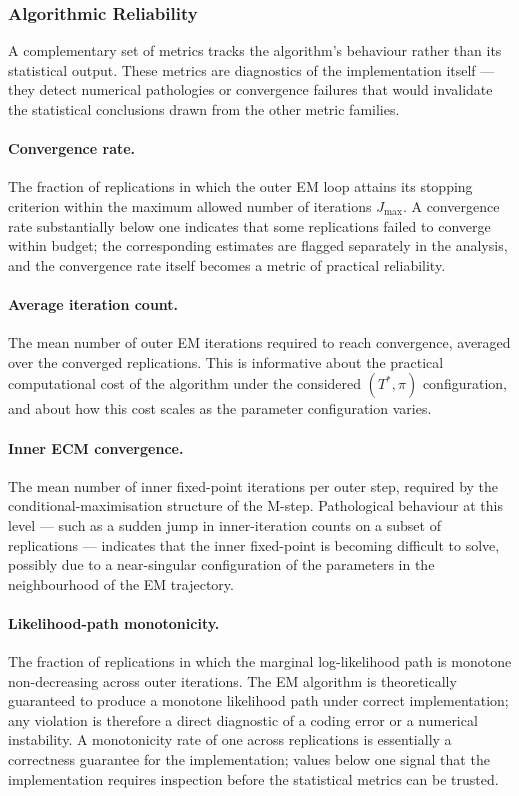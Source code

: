 \documentclass[11pt, a4paper, oneside]{article}
\begin{document}
\subsubsection*{Algorithmic Reliability}

A complementary set of metrics tracks the algorithm's behaviour
rather than its statistical output. These metrics are diagnostics
of the implementation itself — they detect numerical pathologies
or convergence failures that would invalidate the statistical
conclusions drawn from the other metric families.

\paragraph{Convergence rate.}
The fraction of replications in which the outer EM loop attains
its stopping criterion within the maximum allowed number of
iterations $J_{\max}$. A convergence rate substantially below one
indicates that some replications failed to converge within budget;
the corresponding estimates are flagged separately in the analysis,
and the convergence rate itself becomes a metric of practical
reliability.

\paragraph{Average iteration count.}
The mean number of outer EM iterations required to reach
convergence, averaged over the converged replications. This is
informative about the practical computational cost of the
algorithm under the considered $(T^*, \pi)$ configuration, and
about how this cost scales as the parameter configuration varies.

\paragraph{Inner ECM convergence.}
The mean number of inner fixed-point iterations per outer step,
required by the conditional-maximisation structure of the M-step.
Pathological behaviour at this level — such as a sudden jump in
inner-iteration counts on a subset of replications — indicates that
the inner fixed-point is becoming difficult to solve, possibly due
to a near-singular configuration of the parameters in the
neighbourhood of the EM trajectory.

\paragraph{Likelihood-path monotonicity.}
The fraction of replications in which the marginal log-likelihood
path is monotone non-decreasing across outer iterations. The EM
algorithm is theoretically guaranteed to produce a monotone
likelihood path under correct implementation; any violation is
therefore a direct diagnostic of a coding error or a numerical
instability. A monotonicity rate of one across replications is
essentially a correctness guarantee for the implementation; values
below one signal that the implementation requires inspection
before the statistical metrics can be trusted.
\end{document}
